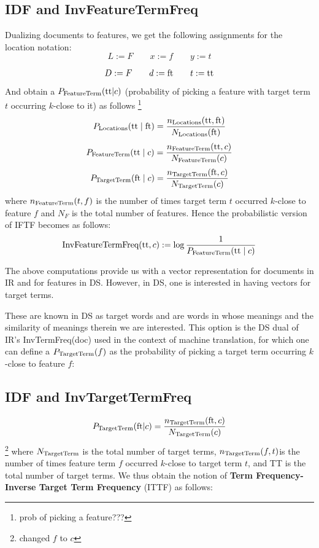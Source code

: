 \hrulefill

\subsection{IDF and InvFeatureTermFreq}

Dualizing documents to features,
we get the following assignments for the location notation:
\[
L := F \qquad
x := f\qquad
y := t
\]

\newcommand{\featureterm}{\textmd{ft}}
\newcommand{\targetterm}{\textmd{tt}}
\[
D := F \qquad
d := \featureterm\qquad
t := \targetterm
\]

And obtain a $P_{\textmd{FeatureTerm}}(\targetterm|c)$ (probability of picking a feature with target term $t$ occurring $k$-close to it) as follows
\footnote{prob of picking a feature???}
\[
P_{\textmd{Locations}}(\targetterm \mid \featureterm) = \frac{n_{\textmd{Locations}}(\targetterm,\featureterm)}{N_{\textmd{Locations}} (\featureterm)} 
\]
\[
P_{\textmd{FeatureTerm}}(\targetterm \mid c) = \frac{n_{\textmd{FeatureTerm}}(\targetterm,c)}{N_{\textmd{FeatureTerm}} (c)} 
\]
\[
P_{\textmd{TargetTerm}}(\featureterm \mid c) = \frac{n_{\textmd{TargetTerm}}(\featureterm,c)}{N_{\textmd{TargetTerm}} (c)} 
\]
where $n_{\textmd{FeatureTerm}}(t,f)$ is the number of times target term $t$ occurred $k$-close to feature $f$ and $N_F$ is the total number of features. Hence the probabilistic version of IFTF becomes as follows:
\begin{equation}
\label{eqn:iftf}
\textmd{InvFeatureTermFreq}(\targetterm, c) :=
	\log{\frac{1}{P_{\textmd{FeatureTerm}}(\targetterm \mid c)}}
\end{equation}

\medskip
The above computations provide us with a vector representation for documents in IR and for features in DS. However, in DS, one is interested in having vectors for target terms.

These are known in DS as target words and  are words in whose meanings and the similarity of meanings therein we are interested.
This option is the DS dual of IR's  InvTermFreq(doc) used in the context of machine translation, for which one can define a $P_{\textmd{TargetTerm}}(f) $ as the  probability of picking a target term  occurring $k$-close to feature $f$: 

\subsection{IDF and InvTargetTermFreq}
\[
P_{\textmd{TargetTerm}}(\featureterm|c) =
\frac{n_{\textmd{TargetTerm}}(\featureterm, c)}{N_{\textmd{TargetTerm}}(c)}
\]
\footnote{changed $f$ to $c$}
where  $N_{\textmd{TargetTerm}}$ is the total number of target terms,    $n_{\textmd{TargetTerm}}(f, t)$is the number of  times feature term $f$ occurred   $k$-close to target term  $t$,  and TT is the total number of target terms. We thus obtain the notion of  {\bf Term Frequency-Inverse Target Term Frequency} (ITTF) as follows:

